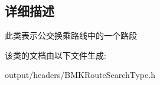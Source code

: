 \subsection{详细描述}
此类表示公交换乘路线中的一个路段 

该类的文档由以下文件生成\+:\begin{DoxyCompactItemize}
\item 
output/headers/B\+M\+K\+Route\+Search\+Type.\+h\end{DoxyCompactItemize}
